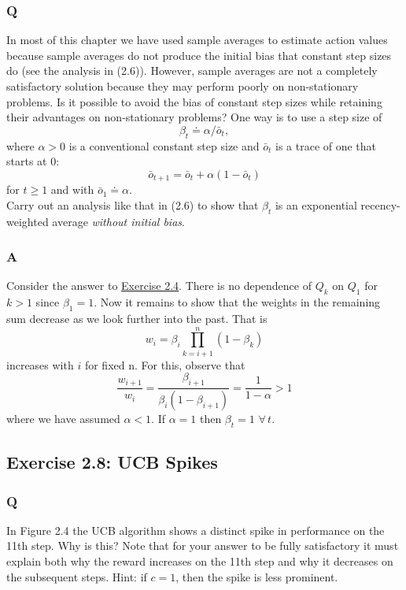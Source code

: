 \subsubsection*{Q}
In most of this chapter we have used sample averages to estimate action values because sample averages do not produce the initial bias that constant step sizes do (see the analysis in (2.6)). However, sample averages are not a completely satisfactory solution because they may perform poorly on non-stationary problems. Is it possible to avoid the bias of constant step sizes while retaining their advantages on non-stationary problems? One way is to use a step size of
\begin{equation}
    \beta_t \doteq \alpha / \bar{o}_t,
\end{equation}
where $\alpha > 0$ is a conventional constant step size and $\bar{o}_t$ is a trace of one that starts at 0:
\begin{equation}
    \bar{o}_{t+1} = \bar{o}_t + \alpha (1 - \bar{o}_t)
\end{equation}
for $t \geq 1$ and with $\bar{o}_1 \doteq \alpha$.\\

Carry out an analysis like that in (2.6) to show that $\beta_t$ is an exponential recency-weighted average \emph{without initial bias}. 

\subsubsection*{A}
Consider the answer to \hyperref[ex:2.4]{Exercise 2.4}. There is no dependence of $Q_k$ on $Q_1$ for $k > 1$ since $\beta_1 = 1$. Now it remains to show that the weights in the remaining sum decrease as we look further into the past. That is
\begin{equation}
    w_i = \beta_i \prod_{k = i + 1}^{n} (1 - \beta_k)
\end{equation}
increases with $i$ for fixed n. For this, observe that
\begin{equation}
    \frac{w_{i+1}}{w_i} = \frac{\beta_{i+1}}{\beta_i(1 - \beta_{i + 1})} = \frac{1}{1 - \alpha} > 1
\end{equation} 
where we have assumed $\alpha < 1$. If $\alpha = 1$ then $\beta_t = 1 \,\, \forall \, t$.

\subsection{Exercise 2.8: UCB Spikes}
\subsubsection*{Q}
In Figure 2.4 the UCB algorithm shows a distinct spike in performance on the 11th step. Why is this? Note that for your answer to be fully satisfactory it must explain both why the reward increases on the 11th step and why it decreases on the subsequent steps. Hint: if $c = 1$, then the spike is less prominent.

